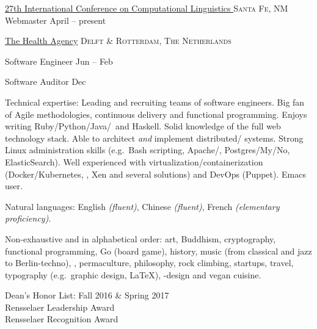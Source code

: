 \documentclass[11pt,a4paper]{article}
\begin{document}
\headedsection
  {\href{http://coling2018.org}{27th International Conference on Computational Linguistics }}
  {\textsc{Santa Fe, NM}} {%
  \headedsubsection
    {Webmaster}
    {April  -- present}
    {}
}

\headedsection
  {
    \href{http://www.thehealthagency.com}{The Health Agency}
  }
  {\textsc{Delft \& Rotterdam, The Netherlands}} {%

  \headedsubsection
    {Software Engineer}
    {Jun  -- Feb }
    {}

  \headedsubsection
    {Software Auditor}
    {Dec }
    {}
  }

\spacedhrule{0.5em}{-0.4em}


\inlineheadsection  %
  {Technical expertise:}
  {Leading and recruiting teams of software engineers.  Big fan of Agile methodologies, continuous delivery and functional programming.  Enjoys writing Ruby/\nsp Python/\nsp Java/\nsp \CPP~and Haskell.  Solid knowledge of the full web technology stack.  Able to architect \textit{and} implement distributed/ systems.  Strong Linux administration skills (e.g.\ Bash scripting, Apache/, Postgres/My/No, ElasticSearch).  Well experienced with virtualization/containerization (Docker/Kubernetes, , Xen and several  solutions) and DevOps (Puppet).  Emacs user.}

\vspace{0.5em}
\inlineheadsection
  {Natural languages:}
  {English \emph{(fluent)}, Chinese \emph{(fluent)}, French \emph{(elementary proficiency)}.}


\spacedhrule{1.6em}{-0.4em}


\inlineheadsection
  {Non-exhaustive and in alphabetical order:}
  {art, Buddhism, cryptography, functional programming, Go (board game), history, music (from classical and jazz to Berlin-techno), , permaculture, philosophy, rock climbing, startups, travel, typography (e.g.\ graphic design, \LaTeX), -design and vegan cuisine.}

\spacedhrule{1.6em}{-0.4em}

  \indent Dean's Honor List: Fall 2016 \& Spring 2017 \\
  \indent Rensselaer Leadership Award \\      
  \indent Rensselaer Recognition Award \\ 
\end{document}
